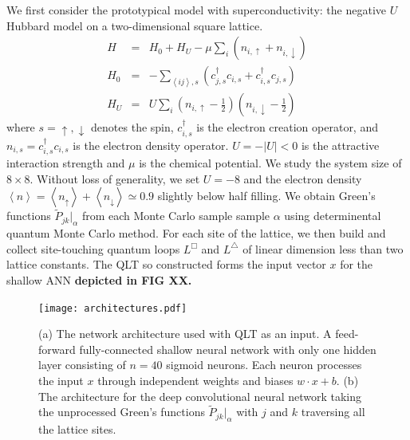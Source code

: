 \documentclass[amsmath,amssymb, aps, prl, twocolumn]{revtex4-1}
\begin{document}
We first consider the prototypical model with superconductivity: the negative $U$ Hubbard model on a two-dimensional square lattice\cite{Scalettar1989, Scalapino1992}. 
\begin{eqnarray}
H &=& H_0 + H_U -  \mu\underset{i}{\sum} \left(n_{i,\uparrow} +n_{i,\downarrow}\right) \nonumber\\
H_0 &=& -\underset{\left\langle ij \right\rangle, s}{\sum} \left( c^\dagger_{j,s}c_{i,s} +  c^\dagger_{i,s}c_{j,s} \right) \nonumber \\
H_U &=& U \underset{i}{\sum} \left(n_{i,\uparrow}-\frac{1}{2}\right) \left(n_{i,\downarrow}-\frac{1}{2}\right)
\label{eq:hubbard}
\end{eqnarray}
where $s = \uparrow, \downarrow$ denotes the spin, $c^\dagger_{i,s}$ is the electron creation operator, and $n_{i,s}=c^\dagger_{i,s}c_{i,s}$ is the electron density operator. $U=-\left|U\right|<0$ is the attractive interaction strength and $\mu$ is the chemical potential. We study the system size of $8\times 8$. Without loss of generality, we set $U=-8$ and the electron density $\left\langle n\right\rangle = \left\langle n_\uparrow\right\rangle+ \left\langle n_\downarrow\right\rangle  \simeq 0.9$ slightly below half filling. We obtain Green's functions $\widetilde{P}_{jk}|_{\alpha}$ from each Monte Carlo sample sample $\alpha$ using determinental quantum Monte Carlo method. For each site of the lattice, we then build and collect site-touching quantum loops $L^\Box$ and $ L^\triangle$ of linear dimension less than two lattice constants. The QLT so constructed forms the input vector $x$ for the shallow ANN {\color{red} \bf depicted in FIG XX.}  



\begin{figure}
    \centering
    \texttt{[image: architectures.pdf]}
    \caption{(a) The network architecture used with QLT as an input. A feed-forward fully-connected shallow neural network with only one hidden layer consisting of $n=40$ sigmoid neurons. Each neuron processes the input $x$ through independent weights and biases $w\cdot x+b$. 
    (b) The architecture for the deep convolutional neural network taking the unprocessed Green's functions $\widetilde{P}_{jk}|_{\alpha}$ with $j$ and $k$ traversing all the lattice sites.}
    \label{fig:my_label}
\end{figure}
\end{document}
